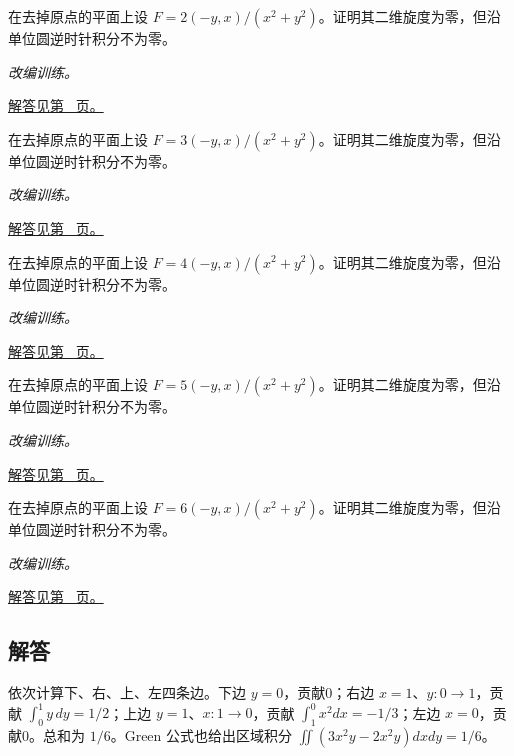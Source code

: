 \documentclass[12pt,fontset=fandol]{ctexart}
\begin{document}
\begin{example}[有孔区域与无旋场]\label{ex:c41q21}
在去掉原点的平面上设 $F=2(-y,x)/(x^2+y^2)$。证明其二维旋度为零，但沿单位圆逆时针积分不为零。
\par\textit{改编训练。}\par\hyperref[ans:c41q21]{解答见第~\pageref{ans:c41q21} 页。}
\end{example}
\begin{example}[有孔区域与无旋场]\label{ex:c41q22}
在去掉原点的平面上设 $F=3(-y,x)/(x^2+y^2)$。证明其二维旋度为零，但沿单位圆逆时针积分不为零。
\par\textit{改编训练。}\par\hyperref[ans:c41q22]{解答见第~\pageref{ans:c41q22} 页。}
\end{example}
\begin{example}[有孔区域与无旋场]\label{ex:c41q23}
在去掉原点的平面上设 $F=4(-y,x)/(x^2+y^2)$。证明其二维旋度为零，但沿单位圆逆时针积分不为零。
\par\textit{改编训练。}\par\hyperref[ans:c41q23]{解答见第~\pageref{ans:c41q23} 页。}
\end{example}
\begin{example}[有孔区域与无旋场]\label{ex:c41q24}
在去掉原点的平面上设 $F=5(-y,x)/(x^2+y^2)$。证明其二维旋度为零，但沿单位圆逆时针积分不为零。
\par\textit{改编训练。}\par\hyperref[ans:c41q24]{解答见第~\pageref{ans:c41q24} 页。}
\end{example}
\begin{example}[有孔区域与无旋场]\label{ex:c41q25}
在去掉原点的平面上设 $F=6(-y,x)/(x^2+y^2)$。证明其二维旋度为零，但沿单位圆逆时针积分不为零。
\par\textit{改编训练。}\par\hyperref[ans:c41q25]{解答见第~\pageref{ans:c41q25} 页。}
\end{example}
\subsection{解答}
\begin{solve}\label{ans:c41q1}
依次计算下、右、上、左四条边。下边 $y=0$，贡献0；右边 $x=1$、$y:0\to1$，贡献 $\int_0^1y\,dy=1/2$；上边 $y=1$、$x:1\to0$，贡献 $\int_1^0x^2dx=-1/3$；左边 $x=0$，贡献0。总和为 $1/6$。Green 公式也给出区域积分 $\iint(3x^2y-2x^2y)dxdy=1/6$。
\end{solve}
\end{document}
